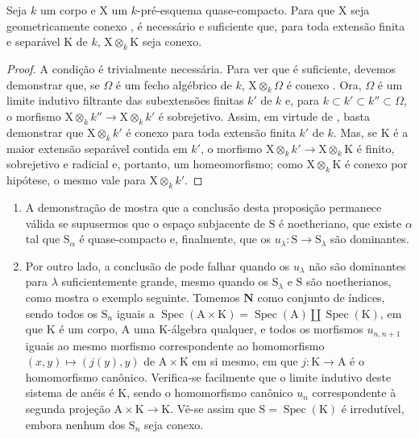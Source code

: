 \begin{corollary}[8.4.5]
\label{IV.8.4.5}
Seja $k$ um corpo e $\mathrm{X}$ um $k$-pré-esquema quase-compacto.
Para que $\mathrm{X}$ seja geometricamente conexo , é necessário e suficiente que, para toda extensão finita e separável $\mathrm{K}$ de $k$, $\mathrm{X}\otimes_k\mathrm{K}$ seja conexo.
\end{corollary}

\begin{proof}
A condição é trivialmente necessária.
Para ver que é suficiente, devemos demonstrar que, se $\Omega$ é um fecho algébrico de $k$, $\mathrm{X}\otimes_k\Omega$ é conexo .
Ora, $\Omega$ é um limite indutivo filtrante das subextensões finitas $k'$ de $k$ e, para $k\subset k'\subset k''\subset\Omega$, o morfismo $\mathrm{X}\otimes_k k''\to\mathrm{X}\otimes_k k'$ é sobrejetivo.
Assim, em virtude de , basta demonstrar que $\mathrm{X}\otimes_k k'$ é conexo para toda extensão finita $k'$ de $k$.
Mas, se $\mathrm{K}$ é a maior extensão separável contida em $k'$, o morfismo $\mathrm{X}\otimes_k k'\to\mathrm{X}\otimes_k\mathrm{K}$ é finito, sobrejetivo e radicial e, portanto,  um homeomorfismo; como $\mathrm{X}\otimes_k\mathrm{K}$ é conexo por hipótese, o mesmo vale para $\mathrm{X}\otimes_k k'$.
\end{proof}

\begin{remark}[8.4.6]
\label{IV.8.4.6}
\begin{enumerate}[label=(\roman*)]
  \item A demonstração de  mostra que a conclusão desta proposição permanece válida se supusermos que o espaço subjacente de $\mathrm{S}$ é noetheriano, que existe $\alpha$ tal que $\mathrm{S}_\alpha$ é quase-compacto e, finalmente, que os $u_\lambda:\mathrm{S}\to\mathrm{S}_\lambda$ são dominantes.
  \item Por outro lado, a conclusão de  pode falhar quando os $u_\lambda$ não são dominantes para $\lambda$ suficientemente grande, mesmo quando os $\mathrm{S}_\lambda$ e $\mathrm{S}$ são noetherianos, como mostra o exemplo seguinte.
Tomemos $\mathbf{N}$ como conjunto de índices, sendo todos os $\mathrm{S}_n$ iguais a $\operatorname{Spec}(\mathrm{A}\times\mathrm{K})=\operatorname{Spec}(\mathrm{A})\amalg\operatorname{Spec}(\mathrm{K})$, em que $\mathrm{K}$ é um corpo, $\mathrm{A}$ uma $\mathrm{K}$-álgebra qualquer, e todos os morfismos $u_{n,n+1}$ iguais ao mesmo morfismo correspondente ao homomorfismo $(x,y)\mapsto(j(y),y)$ de $\mathrm{A}\times\mathrm{K}$ em si mesmo, em que $j:\mathrm{K}\to\mathrm{A}$ é o homomorfismo canônico.
Verifica-se facilmente que o limite indutivo deste sistema de anéis é $\mathrm{K}$, sendo o homomorfismo canônico $u_n$ correspondente à segunda projeção $\mathrm{A}\times\mathrm{K}\to\mathrm{K}$.
Vê-se assim que $\mathrm{S}=\operatorname{Spec}(\mathrm{K})$ é irredutível, embora nenhum dos $\mathrm{S}_n$ seja conexo.
\end{enumerate}
\end{remark}


